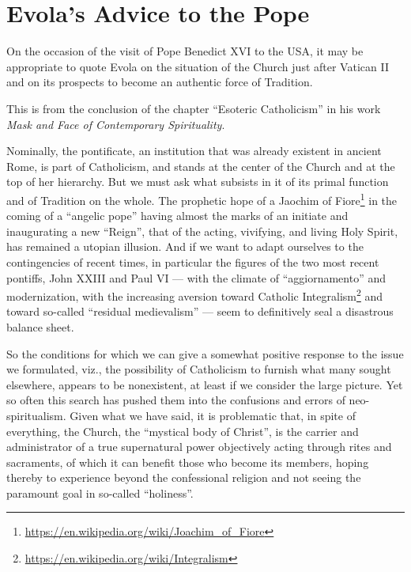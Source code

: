 \section{Evola’s Advice to the Pope}

\begin{quotex}
On the occasion of the visit of Pope Benedict XVI to the USA, it may be appropriate to quote Evola on the situation of the Church just after Vatican II and on its prospects to become an authentic force of Tradition.

This is from the conclusion of the chapter ``Esoteric Catholicism'' in his work \textit{Mask and Face of Contemporary Spirituality}.
\end{quotex}


Nominally, the pontificate, an institution that was already existent in ancient Rome, is part of Catholicism, and stands at the center of the Church and at the top of her hierarchy. But we must ask what subsists in it of its primal function and of Tradition on the whole. The prophetic hope of a Jaochim of Fiore\footnote{\url{https://en.wikipedia.org/wiki/Joachim_of_Fiore}} in the coming of a ``angelic pope'' having almost the marks of an initiate and inaugurating a new ``Reign'', that of the acting, vivifying, and living Holy Spirit, has remained a utopian illusion. And if we want to adapt ourselves to the contingencies of recent times, in particular the figures of the two most recent pontiffs, John XXIII and Paul VI --- with the climate of ``aggiornamento'' and modernization, with the increasing aversion toward Catholic Integralism\footnote{\url{https://en.wikipedia.org/wiki/Integralism}} and toward so-called ``residual medievalism'' --- seem to definitively seal a disastrous balance sheet.

So the conditions for which we can give a somewhat positive response to the issue we formulated, viz., the possibility of Catholicism to furnish what many sought elsewhere, appears to be nonexistent, at least if we consider the large picture. Yet so often this search has pushed them into the confusions and errors of neo-spiritualism. Given what we have said, it is problematic that, in spite of everything, the Church, the ``mystical body of Christ'', is the carrier and administrator of a true supernatural power objectively acting through rites and sacraments, of which it can benefit those who become its members, hoping thereby to experience beyond the confessional religion and not seeing the paramount goal in so-called ``holiness''.

